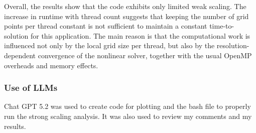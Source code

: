 \documentclass[unicode,10pt,a4paper,oneside,numbers=endperiod,openany]{scrartcl}
\begin{document}
Overall, the results show that the code exhibits only limited weak scaling. The increase in runtime with thread count suggests that keeping the number of grid points per thread constant is not sufficient to maintain a constant time-to-solution for this application. The main reason is that the computational work is influenced not only by the local grid size per thread, but also by the resolution-dependent convergence of the nonlinear solver, together with the usual OpenMP overheads and memory effects.

\subsubsection{Use of LLMs}
Chat GPT 5.2 was used to create code for plotting and the bash file to properly run the strong scaling analysis. It was also used to review my comments and my results.
\end{document}
